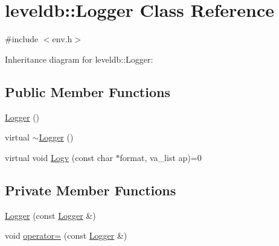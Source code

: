 \hypertarget{classleveldb_1_1_logger}{\section{leveldb\-:\-:Logger Class Reference}
\label{classleveldb_1_1_logger}
}


{\ttfamily \#include $<$env.\-h$>$}



Inheritance diagram for leveldb\-:\-:Logger\-:
\subsection*{Public Member Functions}
\begin{DoxyCompactItemize}
\item 
\hyperlink{classleveldb_1_1_logger_a2aef5b4ed88cf236f12bd5b05aec21f8}{Logger} ()
\item 
virtual \hyperlink{classleveldb_1_1_logger_abfb863947b6bdfb6900dda7e3d9a0fde}{$\sim$\-Logger} ()
\item 
virtual void \hyperlink{classleveldb_1_1_logger_a408e238a0028a45e9cc7aec6ad2277c5}{Logv} (const char $\ast$format, va\-\_\-list ap)=0
\end{DoxyCompactItemize}
\subsection*{Private Member Functions}
\begin{DoxyCompactItemize}
\item 
\hyperlink{classleveldb_1_1_logger_aec5f4501641c1a7d866eba7327ded4e7}{Logger} (const \hyperlink{classleveldb_1_1_logger}{Logger} \&)
\item 
void \hyperlink{classleveldb_1_1_logger_ad5921a86c42c2b228bacc9645d841b2f}{operator=} (const \hyperlink{classleveldb_1_1_logger}{Logger} \&)
\end{DoxyCompactItemize}



